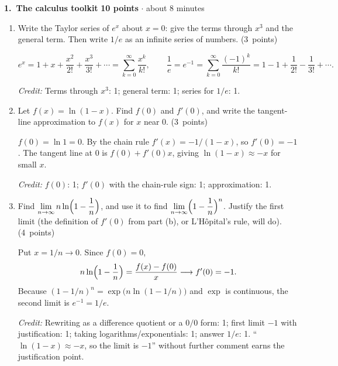 \documentclass[11pt,letterpaper]{article}
\newcommand{\partpts}[1]{\unskip\nobreak\hspace{.3em}%
  \mbox{\small\color{muted}(#1 points)}}
\newcommand{\credit}[1]{\par{\footnotesize\color{muted}\textit{Credit:} #1}}
\newcommand{\problem}[4]{\par\addvspace{8pt}%
  {\large\bfseries\color{indigo}#1.\ #2}\hfill
  {\small\color{muted}\textbf{#3 points} $\cdot$ about #4 minutes}\par\nobreak}
\begin{document}
\problem{1}{The calculus toolkit}{10}{8}
\begin{enumerate}
  \item Write the Taylor series of $e^x$ about $x=0$: give the terms through
  $x^3$ and the general term. Then write $1/e$ as an infinite series of
  numbers. \partpts{3}
  \begin{solution}[1.5in]
    \[
      e^x=1+x+\frac{x^2}{2!}+\frac{x^3}{3!}+\cdots
         =\sum_{k=0}^\infty\frac{x^k}{k!},
      \qquad
      \frac1e=e^{-1}=\sum_{k=0}^\infty\frac{(-1)^k}{k!}
      =1-1+\frac1{2!}-\frac1{3!}+\cdots.
    \]
    \credit{Terms through $x^3$: 1; general term: 1; series for $1/e$: 1.}
  \end{solution}

  \item Let $f(x)=\ln(1-x)$. Find $f(0)$ and $f'(0)$, and write the
  tangent-line approximation to $f(x)$ for $x$ near $0$. \partpts{3}
  \begin{solution}[1.5in]
    $f(0)=\ln1=0$. By the chain rule $f'(x)=-1/(1-x)$, so $f'(0)=-1$.
    The tangent line at $0$ is $f(0)+f'(0)x$, giving
    $\ln(1-x)\approx -x$ for small $x$.
    \credit{$f(0)$: 1; $f'(0)$ with the chain-rule sign: 1; approximation: 1.}
  \end{solution}

  \item Find $\displaystyle\lim_{n\to\infty}n\ln\Bigl(1-\frac1n\Bigr)$, and
  use it to find $\displaystyle\lim_{n\to\infty}\Bigl(1-\frac1n\Bigr)^{n}$.
  Justify the first limit (the definition of $f'(0)$ from part (b), or
  L'H\^opital's rule, will do). \partpts{4}
  \begin{solution}[2.2in]
    Put $x=1/n\to0$. Since $f(0)=0$,
    \[
      n\ln\Bigl(1-\frac1n\Bigr)=\frac{f(x)-f(0)}{x}\longrightarrow f'(0)=-1 .
    \]
    Because $(1-1/n)^n=\exp\bigl(n\ln(1-1/n)\bigr)$ and $\exp$ is continuous,
    the second limit is $e^{-1}=1/e$.
    \credit{Rewriting as a difference quotient or a $0/0$ form: 1; first
    limit $-1$ with justification: 1; taking logarithms/exponentials: 1;
    answer $1/e$: 1. ``$\ln(1-x)\approx-x$, so the limit is $-1$'' without
    further comment earns the justification point.}
  \end{solution}
\end{enumerate}
\end{document}
